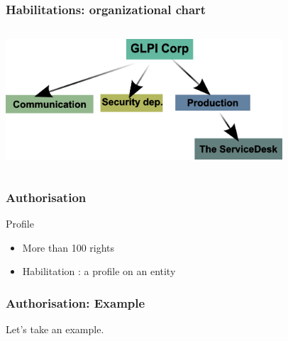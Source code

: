 \documentclass{beamer}
\begin{document}
\begin{frame}
\frametitle{Habilitations: organizational chart}
\begin{columns}
 \begin{column}{0.45\textwidth}
         \includegraphics[height=4.5cm]{./pics/entites.png}
 \end{column}
 \begin{column}{0.45\textwidth}
 \end{column}
\end{columns}
\end{frame}





\begin{frame}
\frametitle{Authorisation}
    \begin{block}{Profile}
        \begin{itemize}
            \item More than 100 rights
            \item Habilitation : a profile on an entity 
        \end{itemize}
    \end{block}
\end{frame}


\begin{frame}
\frametitle{Authorisation: Example}
Let's take an example.
\end{frame}
\end{document}
